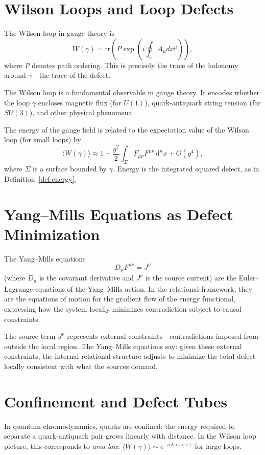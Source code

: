 \documentclass[12pt,a4paper,openany]{book}
\theoremstyle{plain}
\theoremstyle{definition}
\theoremstyle{remark}
\newcommand{\dvol}{\,\mathrm{d}^n x}
\begin{document}
\section{Wilson Loops and Loop Defects}

The Wilson loop in gauge theory is
\[
W(\gamma) = \mathrm{tr}\left( P \exp\!\left( i \oint_\gamma A_\mu dx^\mu \right) \right),
\]
where $P$ denotes path ordering. This is precisely the trace of the holonomy around $\gamma$---the trace of the defect.

The Wilson loop is a fundamental observable in gauge theory. It encodes whether the loop $\gamma$ encloses magnetic flux (for $U(1)$), quark-antiquark string tension (for $SU(3)$), and other physical phenomena.

The energy of the gauge field is related to the expectation value of the Wilson loop (for small loops) by
\[
\langle W(\gamma) \rangle \approx 1 - \frac{g^2}{2} \int_\Sigma F_{\mu\nu} F^{\mu\nu} \dvol + O(g^4),
\]
where $\Sigma$ is a surface bounded by $\gamma$. Energy is the integrated squared defect, as in Definition~\ref{def:energy}.

\section{Yang--Mills Equations as Defect Minimization}

The Yang--Mills equations
\[
D_\mu F^{\mu\nu} = J^\nu
\]
(where $D_\mu$ is the covariant derivative and $J^\nu$ is the source current) are the Euler--Lagrange equations of the Yang--Mills action. In the relational framework, they are the equations of motion for the gradient flow of the energy functional, expressing how the system locally minimizes contradiction subject to causal constraints.

The source term $J^\nu$ represents external constraints---contradictions imposed from outside the local region. The Yang--Mills equations say: given these external constraints, the internal relational structure adjusts to minimize the total defect locally consistent with what the sources demand.

\section{Confinement and Defect Tubes}

In quantum chromodynamics, quarks are confined: the energy required to separate a quark-antiquark pair grows linearly with distance. In the Wilson loop picture, this corresponds to \emph{area law}: $\langle W(\gamma) \rangle \sim e^{-\sigma \text{Area}(\gamma)}$ for large loops.
\end{document}
